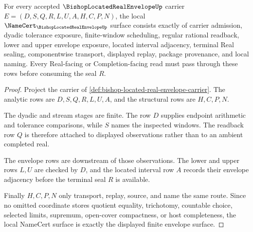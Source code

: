 \begin{theorem}
\label{thm:bishop-located-real-envelope-namecert-obligations}
For every accepted $\BishopLocatedRealEnvelopeUp$ carrier $E=(D,S,Q,R,L,U,A,H,C,P,N)$, the local $\NameCert_{\BishopLocatedRealEnvelopeUp}$ surface consists exactly of carrier admission, dyadic tolerance exposure, finite-window scheduling, regular rational readback, lower and upper envelope exposure, located interval adjacency, terminal Real sealing, componentwise transport, displayed replay, package provenance, and local naming. Every Real-facing or Completion-facing read must pass through these rows before consuming the seal $R$.
\end{theorem}
\begin{proof}
Project the carrier of \autoref{def:bishop-located-real-envelope-carrier}. The analytic rows are $D,S,Q,R,L,U,A$, and the structural rows are $H,C,P,N$.

The dyadic and stream stages are finite. The row $D$ supplies endpoint arithmetic and tolerance comparisons, while $S$ names the inspected windows. The readback row $Q$ is therefore attached to displayed observations rather than to an ambient completed real.

The envelope rows are downstream of those observations. The lower and upper rows $L,U$ are checked by $D$, and the located interval row $A$ records their envelope adjacency before the terminal seal $R$ is available.

Finally $H,C,P,N$ only transport, replay, source, and name the same route. Since no omitted coordinate stores quotient equality, trichotomy, countable choice, selected limits, supremum, open-cover compactness, or host completeness, the local NameCert surface is exactly the displayed finite envelope surface.
\end{proof}

